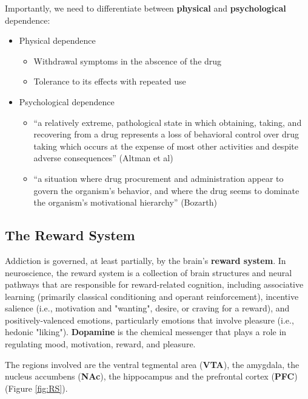 \documentclass{book}
\begin{document}
Importantly, we need to differentiate between \textbf{physical} and \textbf{psychological} dependence:

\begin{itemize}
    \item Physical dependence
    \begin{itemize}
        \item Withdrawal symptoms in the abscence of the drug
        \item Tolerance to its effects with repeated use
    \end{itemize}

    \item Psychological dependence
    \begin{itemize}
        \item “a relatively extreme, pathological state in which obtaining, taking, and recovering from a drug represents a loss of behavioral control over drug taking which occurs at the expense of most other activities and despite adverse consequences” (Altman et al)
        \item “a situation where drug procurement and administration appear to govern the organism's behavior, and where the drug seems to dominate the organism's motivational hierarchy” (Bozarth)
    \end{itemize}
\end{itemize}

\subsection{The Reward System}  
Addiction is governed, at least partially, by the brain's \textbf{reward system}.
In neuroscience, the reward system is a collection of brain structures and neural pathways that are responsible for reward-related cognition, including associative learning (primarily classical conditioning and operant reinforcement), incentive salience (i.e., motivation and "wanting", desire, or craving for a reward), and positively-valenced emotions, particularly emotions that involve pleasure (i.e., hedonic "liking").
\textbf{Dopamine} is the chemical messenger that plays a role in regulating mood, motivation, reward, and pleasure.

The regions involved are the ventral tegmental area (\textbf{VTA}), the amygdala, the nucleus accumbens (\textbf{NAc}), the hippocampus and the prefrontal cortex (\textbf{PFC}) (Figure \ref{fig:RS}).
\end{document}
